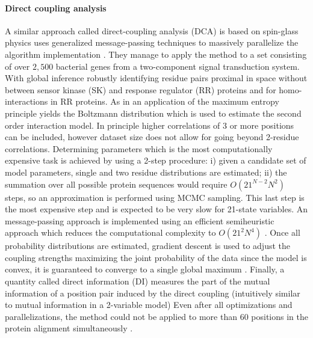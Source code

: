 \paragraph{Direct coupling analysis}
A similar approach called  direct-coupling analysis (DCA) is based on spin-glass physics uses generalized message-passing techniques to massively parallelize the algorithm implementation \cite{weigt2009identification}.
They manage to apply the method to a set consisting of over $2,500$ bacterial genes from a two-component signal transduction system.
With global inference robustly identifying residue pairs proximal in space without between sensor kinase (SK) and response regulator (RR) proteins and for homo-interactions in RR proteins. \cite{weigt2009identification}
As in \cite{lapedes2012using} an application of the maximum entropy principle yields the Boltzmann distribution which is used to estimate the second order interaction model.
In principle higher correlations of 3 or more positions can be included, however dataset size does not allow for going beyond \cite{weigt2009identification} 2-residue correlations. 
Determining parameters which is the most computationally expensive task is achieved by using a 2-step procedure: i) given a candidate set of model parameters, single and two residue distributions are estimated; ii) the summation over all possible protein sequences would require $O(21^{N-2} N^2)$ steps, so an approximation is performed using MCMC sampling. 
This last step is the most expensive step and is expected to be very slow for 21-state variables.
An message-passing approach is implemented using an efficient semiheuristic approach which reduces the computational complexity to $O(21^2 N^4)$ \cite{weigt2009identification}.
Once all probability distributions are estimated, gradient descent is used to adjust the coupling strengths maximizing the joint probability of the data since the model is convex, it is guaranteed to converge to a single global maximum \cite{weigt2009identification}.
Finally, a quantity called direct information (DI) measures the part of the mutual information of a position pair induced by the direct coupling (intuitively similar to mutual information in a 2-variable model) \cite{weigt2009identification}
Even after all optimizations and parallelizations, the method could not be applied to more than $60$ positions in the protein alignment simultaneously \cite{weigt2009identification}.


